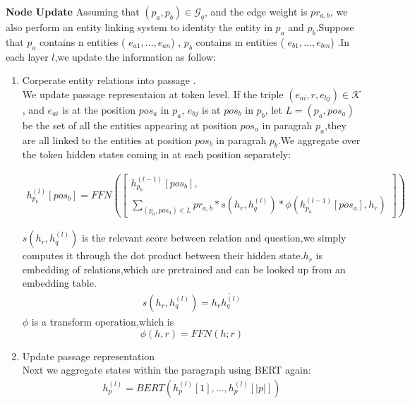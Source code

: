 \documentclass[sigconf]{acmart}
\begin{document}
	\textbf{Node Update}		
	 Assuming that $(p_a,p_b) \in \mathcal{G}_q$, and the edge weight is $pr_{a,b}$, we also perform an entity linking system\cite{ferragina2011fast} to identity the  entity in $p_a$ and $p_b$.Suppose that		
		$p_a$ contains n entities ( $e_{a1},...,e_{an}$) ,		
		$p_b$ contains m entities ( $e_{b1},...,e_{bm}$) .In each layer $l$,we update the information as follow:
		\begin{enumerate}[(1)]
		\item Corperate entity relations into passage .\\	
			We update passage representaion at token level.	
			If the triple $(e_{ai},r,e_{bj}) \in \mathcal{K}$, and $e_{ai}$ is at the position $pos_a$ in $p_a$, $e_{bj}$ is at  $pos_b$  in $p_b$,		
			let $L=(p_a,pos_a)$ be the set of all the entities appearing at position $pos_a$ in paragrah $p_a$,they are all linked to the entities at position $pos_b$ in paragrah $p_b$.We aggregate over the token hidden states coming in at
			each position separately: 
			
			\begin{displaymath}
				\begin{aligned}
					h^{(l)}_{p_b}[pos_b] = FFN
					\left(					 
						\begin{bmatrix}  
							h^{(l-1)}_{p_b}[pos_b],\\ 		
							\sum\limits_{(p_a,pos_a) \in L}
							pr_{a,b}*
							s(h_r,h_q^{(l)})*
							\phi(h^{(l-1)}_{p_a}[pos_a],h_r)
						\end{bmatrix} 
					\right)								
				\end{aligned}
			\end{displaymath}
		
		$s(h_r,h_q^{(l)})$ is the relevant score between relation and question,we simply computes it through the dot product between their hidden state.$h_r$ is embedding of  relations,which are pretrained and can be looked up from an embedding table.
		 \begin{displaymath}
		 	\begin{aligned}
		 		s(h_r,h_q^{(l)}) = h_r\dot{h_q^{(l)}}
	 		\end{aligned}
 		\end{displaymath}
 		$\phi$ is a transform operation,which is 
 		 \begin{displaymath}
 		 	\phi(h,r) = FFN(h;r)
 		 \end{displaymath}
		
		\item Update passage representation\\
		Next we aggregate states within the paragraph using BERT again:
		\begin{displaymath}
			\begin{aligned}
				h_{p}^{(l)} = BERT(h_p^{(l)}[1],...,h_p^{(l)}[|p|])
			\end{aligned}
		\end{displaymath}
	

\end{enumerate}
\end{document}
